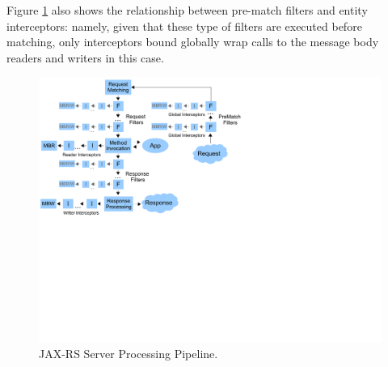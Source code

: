 Figure \ref{jaxrs_pipeline} also shows the relationship between pre-match filters and entity interceptors: namely, given that these type of filters are executed before matching, only interceptors bound globally wrap calls to the message body readers and writers in this case.

\begin{figure}[H]
\label{jaxrs_pipeline}
\centering
\includegraphics{chapters/jaxrs_pipeline.pdf}
\caption{JAX-RS Server Processing Pipeline.}
\end{figure}

